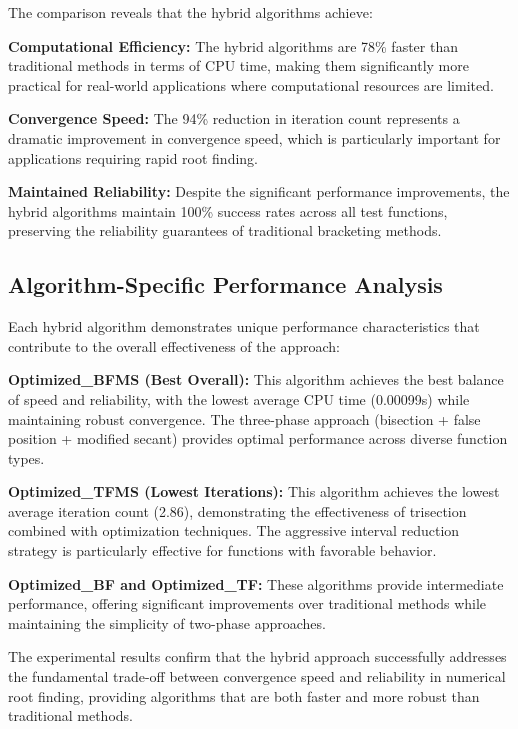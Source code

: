\documentclass[amsmath, amssymb, aps]{revtex4-2}
\begin{document}
The comparison reveals that the hybrid algorithms achieve:

\textbf{Computational Efficiency:} The hybrid algorithms are 78\% faster than traditional methods in terms of CPU time, making them significantly more practical for real-world applications where computational resources are limited.

\textbf{Convergence Speed:} The 94\% reduction in iteration count represents a dramatic improvement in convergence speed, which is particularly important for applications requiring rapid root finding.

\textbf{Maintained Reliability:} Despite the significant performance improvements, the hybrid algorithms maintain 100\% success rates across all test functions, preserving the reliability guarantees of traditional bracketing methods.

\subsection{Algorithm-Specific Performance Analysis}

Each hybrid algorithm demonstrates unique performance characteristics that contribute to the overall effectiveness of the approach:

\textbf{Optimized\_BFMS (Best Overall):} This algorithm achieves the best balance of speed and reliability, with the lowest average CPU time (0.00099s) while maintaining robust convergence. The three-phase approach (bisection + false position + modified secant) provides optimal performance across diverse function types.

\textbf{Optimized\_TFMS (Lowest Iterations):} This algorithm achieves the lowest average iteration count (2.86), demonstrating the effectiveness of trisection combined with optimization techniques. The aggressive interval reduction strategy is particularly effective for functions with favorable behavior.

\textbf{Optimized\_BF and Optimized\_TF:} These algorithms provide intermediate performance, offering significant improvements over traditional methods while maintaining the simplicity of two-phase approaches.

The experimental results confirm that the hybrid approach successfully addresses the fundamental trade-off between convergence speed and reliability in numerical root finding, providing algorithms that are both faster and more robust than traditional methods.
\end{document}
